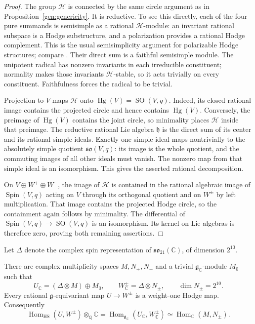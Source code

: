 \begin{proof}
The group $\mathcal H$ is connected by the same circle argument as in
Proposition~\ref{gen:genericity}.  It is reductive.  To see this directly,
each of the four pure summands is semisimple as a rational
$\mathcal H$-module: an invariant rational subspace is a Hodge
substructure, and a polarization provides a rational Hodge complement.
This is the usual semisimplicity argument for polarizable Hodge
structures; compare \cite[Proposition~3.6]{Deligne}.  Their direct sum is
a faithful semisimple module.  The unipotent radical has nonzero
invariants in each irreducible constituent; normality makes those
invariants $\mathcal H$-stable, so it acts trivially on every
constituent.  Faithfulness forces the radical to be trivial.

Projection to $V$ maps $\mathcal H$ onto
$\operatorname{Hg}(V)=\operatorname{SO}(V,q)$.
Indeed, its closed rational image contains the projected circle and
hence contains $\operatorname{Hg}(V)$. Conversely, the preimage of
$\operatorname{Hg}(V)$ contains the joint circle, so minimality places
$\mathcal H$ inside that preimage.
The reductive rational Lie algebra $\mathfrak h$ is
the direct sum of its center and its rational simple ideals.  Exactly
one simple ideal maps nontrivially to the absolutely simple quotient
$\mathfrak{so}(V,q)$: its image is the whole quotient, and the commuting
images of all other ideals must vanish.  The nonzero map from that
simple ideal is an isomorphism.  This gives the asserted rational
decomposition.

On $V\oplus W^+\oplus W^-$, the image of $\mathcal H$ is contained in
the rational algebraic image of $\operatorname{Spin}(V,q)$ acting on
$V$ through its orthogonal quotient and on $W^\pm$ by left
multiplication.  That image contains the projected Hodge circle, so
the containment again follows by minimality.  The differential of
$\operatorname{Spin}(V,q)\to\operatorname{SO}(V,q)$ is an isomorphism.
Its kernel on Lie algebras is therefore zero, proving both remaining
assertions.
\end{proof}

Let $\Delta$ denote the complex spin representation of
$\mathfrak{so}_{21}(\mathbb C)$, of dimension $2^{10}$.

\begin{lemma}\label{gen:width}
There are complex multiplicity spaces $M,N_+,N_-$ and a trivial
$\mathfrak g_{\mathbb C}$-module $M_0$ such that
\begin{equation}\label{gen:spin-decompositions}
 U_{\mathbb C}=(\Delta\otimes M)\oplus M_0,
 \qquad W^\pm_{\mathbb C}=\Delta\otimes N_\pm,
 \qquad \dim N_\pm=2^{10}.
\end{equation}
Every rational $\mathfrak g$-equivariant map $U\to W^\pm$ is a
weight-one Hodge map.  Consequently
\begin{equation}\label{gen:hom-base-change}
 \operatorname{Hom}_{\mathrm{HS}}(U,W^\pm)\otimes_{\mathbb Q}\mathbb C
 =\operatorname{Hom}_{\mathfrak g_{\mathbb C}}
       (U_{\mathbb C},W^\pm_{\mathbb C})
 \simeq\operatorname{Hom}_{\mathbb C}(M,N_\pm).
\end{equation}
\end{lemma}

